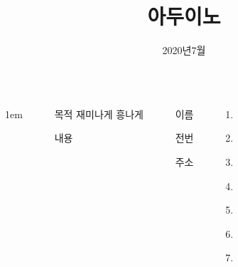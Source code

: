 \documentclass[20pt, a1paper ]{tikzposter}
\title{아두이노 }
\author{2020년7월 }
\begin{document}
	\maketitle

	\begin{columns}


			{
					\setlength{\leftmargini}{7em}
					\setlength{\labelsep} {1em}
				\begin{LARGE}
					\begin{itemize}
					\item [목적] 재미나게 흥나게
					\item [내용] 
					\end{itemize}
				\end{LARGE}
			}


		{
			\setlength{\leftmargini}{7em}			
			\setlength{\labelsep}{1em} %

			\begin{LARGE}
			\begin{itemize}
			\item [이름]
			\item [전번]
			\item [주소] 
			\end{itemize}
			\end{LARGE}

		}

		{
			\setlength{\leftmargini}{5em}			
			\setlength{\labelsep}{1em} %
			\begin{LARGE}
			\begin{itemize}
			\item [1.] 
			\item [2.] 
			\item [3.] 
			\item [4.] 
			\item [5.] 
			\item [6.] 
			\item [7.] 
			\end{itemize}
			\end{LARGE}

}
\end{columns}
\end{document}
